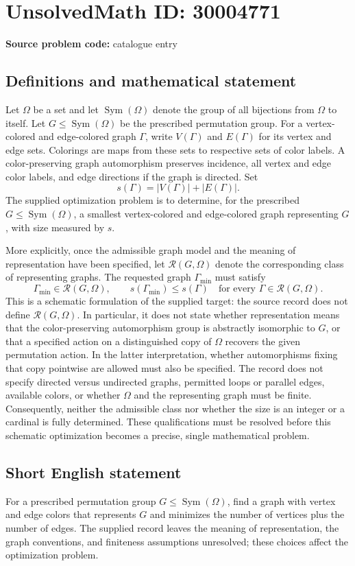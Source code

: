\documentclass[11pt]{article}
\begin{document}
\section*{UnsolvedMath ID: 30004771}
\textbf{Source problem code:} catalogue entry
\subsection{Definitions and mathematical statement}
Let \(\Omega\) be a set and let \(\operatorname{Sym}(\Omega)\) denote the group of all bijections from \(\Omega\) to itself. Let \(G\leq\operatorname{Sym}(\Omega)\) be the prescribed permutation group. For a vertex-colored and edge-colored graph \(\Gamma\), write \(V(\Gamma)\) and \(E(\Gamma)\) for its vertex and edge sets. Colorings are maps from these sets to respective sets of color labels. A color-preserving graph automorphism preserves incidence, all vertex and edge color labels, and edge directions if the graph is directed. Set
\[
 s(\Gamma)=|V(\Gamma)|+|E(\Gamma)|.
\]
The supplied optimization problem is to determine, for the prescribed \(G\leq\operatorname{Sym}(\Omega)\), a smallest vertex-colored and edge-colored graph representing \(G\), with size measured by \(s\).

More explicitly, once the admissible graph model and the meaning of representation have been specified, let \(\mathcal R(G,\Omega)\) denote the corresponding class of representing graphs. The requested graph \(\Gamma_{\min}\) must satisfy
\[
 \Gamma_{\min}\in\mathcal R(G,\Omega),\qquad
 s(\Gamma_{\min})\leq s(\Gamma)
 \quad\text{for every }\Gamma\in\mathcal R(G,\Omega).
\]
This is a schematic formulation of the supplied target: the source record does not define \(\mathcal R(G,\Omega)\). In particular, it does not state whether representation means that the color-preserving automorphism group is abstractly isomorphic to \(G\), or that a specified action on a distinguished copy of \(\Omega\) recovers the given permutation action. In the latter interpretation, whether automorphisms fixing that copy pointwise are allowed must also be specified. The record does not specify directed versus undirected graphs, permitted loops or parallel edges, available colors, or whether \(\Omega\) and the representing graph must be finite. Consequently, neither the admissible class nor whether the size is an integer or a cardinal is fully determined. These qualifications must be resolved before this schematic optimization becomes a precise, single mathematical problem.
\subsection{Short English statement}
For a prescribed permutation group \(G\leq\operatorname{Sym}(\Omega)\), find a graph with vertex and edge colors that represents \(G\) and minimizes the number of vertices plus the number of edges. The supplied record leaves the meaning of representation, the graph conventions, and finiteness assumptions unresolved; these choices affect the optimization problem.
\end{document}
